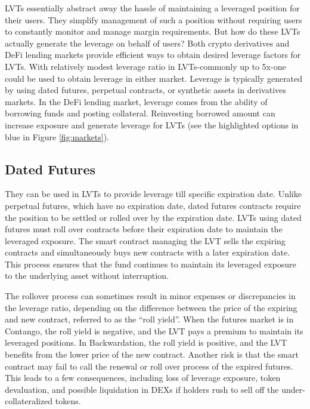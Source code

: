 LVTs essentially abstract away the hassle of maintaining a leveraged position for their users. They simplify management of such a position without requiring users to constantly monitor and manage margin requirements. But how do these LVTs actually generate the leverage on behalf of users? Both crypto derivatives and DeFi lending markets provide efficient ways to obtain desired leverage factors for LVTs. With relatively modest leverage ratio in LVTs-commonly up to 5x-one could be used to obtain leverage in either market. Leverage is typically generated by using dated futures, perpetual contracts, or synthetic assets in derivatives markets. In the DeFi lending market, leverage comes from the ability of borrowing funds and posting collateral. Reinvesting borrowed amount can increase exposure and generate leverage for LVTs (see the highlighted options in blue in Figure \ref{fig:markets}). 

\subsection{Dated Futures}
They can be used in LVTs to provide leverage till specific expiration date. Unlike perpetual futures, which have no expiration date, dated futures contracts require the position to be settled or rolled over by the expiration date. LVTs using dated futures must roll over contracts before their expiration date to maintain the leveraged exposure. The smart contract managing the LVT sells the expiring contracts and simultaneously buys new contracts with a later expiration date. This process ensures that the fund continues to maintain its leveraged exposure to the underlying asset without interruption. 

The rollover process can sometimes result in minor expenses or discrepancies in the leverage ratio, depending on the difference between the price of the expiring and new contract, referred to as the ``roll yield''. When the futures market is in Contango, the roll yield is negative, and the LVT pays a premium to maintain its leveraged positions. In Backwardation, the roll yield is positive, and the LVT benefits from the lower price of the new contract. Another risk is that the smart contract may fail to call the renewal or roll over process of the expired futures. This leads to a few consequences, including loss of leverage exposure, token devaluation, and possible liquidation in DEXs if holders rush to sell off the under-collateralized tokens.

